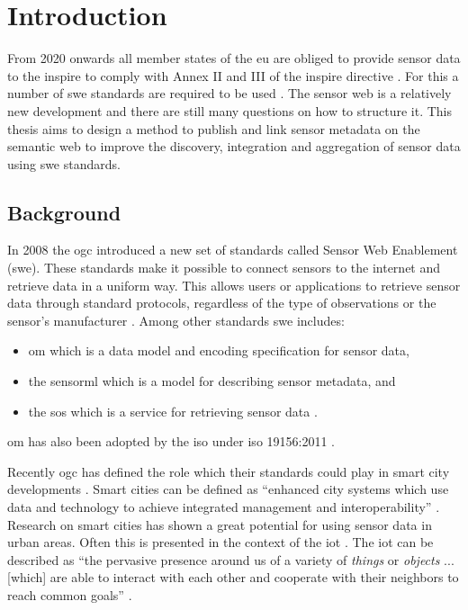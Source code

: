 

\chapter{Introduction}
\label{chap:introduction}
From 2020 onwards all member states of the \ac{eu} are obliged to provide sensor data to the \ac{inspire} to comply with Annex II and III of the \ac{inspire} directive \citep{SDI:INSPIRE5}. For this a number of \ac{swe} standards are required to be used \citep{SDI:INSPIRE2}. The sensor web is a relatively new development and there are still many questions on how to structure it. This thesis aims to design a method to publish and link sensor metadata on the semantic web to improve the discovery, integration and aggregation of sensor data using \ac{swe} standards.


\section{Background}
In 2008 the \ac{ogc} introduced a new set of standards called Sensor Web Enablement (\ac{swe}). These standards make it possible to connect sensors to the internet and retrieve data in a uniform way. This allows users or applications to retrieve sensor data through standard protocols, regardless of the type of observations or the sensor's manufacturer \citep{SW:Botts}. Among other standards \ac{swe} includes:
\begin{itemize}
	\item \acf{om} which is a data model and encoding specification for sensor data,
	\item the \acf{sensorml} which is a model for describing sensor metadata, and
	\item the \acf{sos} which is a service for retrieving sensor data \citep{SW:OGC}.
\end{itemize}
\ac{om} has also been adopted by the \ac{iso} under \ac{iso} 19156:2011 \citep{SW:ISO}. 

Recently \ac{ogc} has defined the role which their standards could play in smart city developments \citep{SC:OGC}. Smart cities can be defined as \enquote{enhanced city systems which use data and technology to achieve integrated management and interoperability} \citep[p. 18]{SC:Moir}. Research on smart cities has shown a great potential for using sensor data in urban areas. Often this is presented in the context of the \ac{iot} \citep{IOT:Zanelli, SSW:Wang2}. The \ac{iot} can be described as \enquote{the pervasive presence around us of a variety of \textit{things} or \textit{objects} ... [which] are able to interact with each other and cooperate with their neighbors to reach common goals} \cite[p. 2787]{IOT:Atzori}. 

